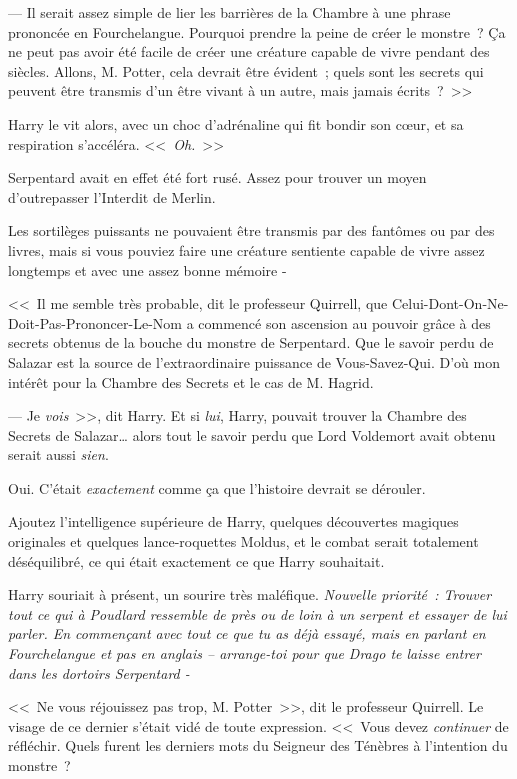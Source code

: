 --- Il serait assez simple de lier les barrières de la Chambre à une phrase prononcée en Fourchelangue. Pourquoi prendre la peine de créer le monstre~? Ça ne peut pas avoir été facile de créer une créature capable de vivre pendant des siècles. Allons, M. Potter, cela devrait être évident~; quels sont les secrets qui peuvent être transmis d'un être vivant à un autre, mais jamais écrits~?~>>

Harry le vit alors, avec un choc d'adrénaline qui fit bondir son cœur, et sa respiration s'accéléra. <<~\emph{Oh.}~>>

Serpentard avait en effet été fort rusé. Assez pour trouver un moyen d'outrepasser l'Interdit de Merlin.

Les sortilèges puissants ne pouvaient être transmis par des fantômes ou par des livres, mais si vous pouviez faire une créature sentiente capable de vivre assez longtemps et avec une assez bonne mémoire -

<<~Il me semble très probable, dit le professeur Quirrell, que Celui-Dont-On-Ne-Doit-Pas-Prononcer-Le-Nom a commencé son ascension au pouvoir grâce à des secrets obtenus de la bouche du monstre de Serpentard. Que le savoir perdu de Salazar est la source de l'extraordinaire puissance de Vous-Savez-Qui. D'où mon intérêt pour la Chambre des Secrets et le cas de M. Hagrid.

--- Je \emph{vois}~>>, dit Harry. Et si \emph{lui}, Harry, pouvait trouver la Chambre des Secrets de Salazar… alors tout le savoir perdu que Lord Voldemort avait obtenu serait aussi \emph{sien}.

Oui. C'était \emph{exactement} comme ça que l'histoire devrait se dérouler.

Ajoutez l'intelligence supérieure de Harry, quelques découvertes magiques originales et quelques lance-roquettes Moldus, et le combat serait totalement déséquilibré, ce qui était exactement ce que Harry souhaitait.

Harry souriait à présent, un sourire très maléfique. \emph{Nouvelle priorité~: Trouver tout ce qui à Poudlard ressemble de près ou de loin à un serpent et essayer de lui parler. En commençant avec tout ce que tu as déjà essayé, mais en parlant en Fourchelangue et pas en anglais -- arrange-toi pour que Drago te laisse entrer dans les dortoirs Serpentard -}

<<~Ne vous réjouissez pas trop, M. Potter~>>, dit le professeur Quirrell. Le visage de ce dernier s'était vidé de toute expression. <<~Vous devez \emph{continuer} de réfléchir. Quels furent les derniers mots du Seigneur des Ténèbres à l'intention du monstre~?

